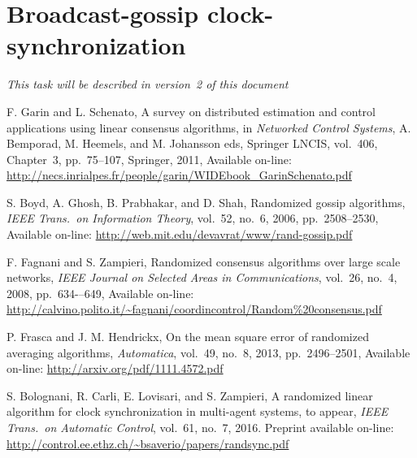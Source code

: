 \documentclass{article}
\begin{document}
\section{Broadcast-gossip clock-synchronization}

\textit{This task will be described in version~2 of this document}


\begin{thebibliography}{99}

F. Garin and L. Schenato, A survey on distributed estimation and control applications using linear consensus algorithms, in {\it Networked Control Systems}, A. Bemporad, M. Heemels, and M. Johansson eds, Springer LNCIS, vol.~406, Chapter~3, pp.~75--107, Springer, 2011, Available on-line: \url{http://necs.inrialpes.fr/people/garin/WIDEbook_GarinSchenato.pdf}


S. Boyd, A. Ghosh, B. Prabhakar, and D. Shah, Randomized gossip algorithms, {\it IEEE Trans.\ on Information Theory}, vol.~52, no.~6, 2006, pp.~2508--2530, Available on-line: \url{http://web.mit.edu/devavrat/www/rand-gossip.pdf}


F. Fagnani and S. Zampieri, Randomized consensus algorithms over large scale networks,
{\it IEEE Journal on Selected Areas in Communications}, vol.~26, no.~4, 2008, pp.~634-–649, Available on-line:
\url{http://calvino.polito.it/~fagnani/coordincontrol/Random%20consensus.pdf}

P. Frasca and J. M. Hendrickx, On the mean square error of randomized averaging algorithms, {\it Automatica}, vol.~49, no.~8, 2013, pp.~2496--2501, Available on-line: \url{http://arxiv.org/pdf/1111.4572.pdf}

S. Bolognani, R. Carli, E. Lovisari, and S. Zampieri,
A randomized linear algorithm for clock synchronization in multi-agent systems,
to appear, {\it IEEE Trans.\ on Automatic Control}, vol.~61, no.~7, 2016.
Preprint available on-line:
\url{http://control.ee.ethz.ch/~bsaverio/papers/randsync.pdf}


\end{thebibliography}
\end{document}

